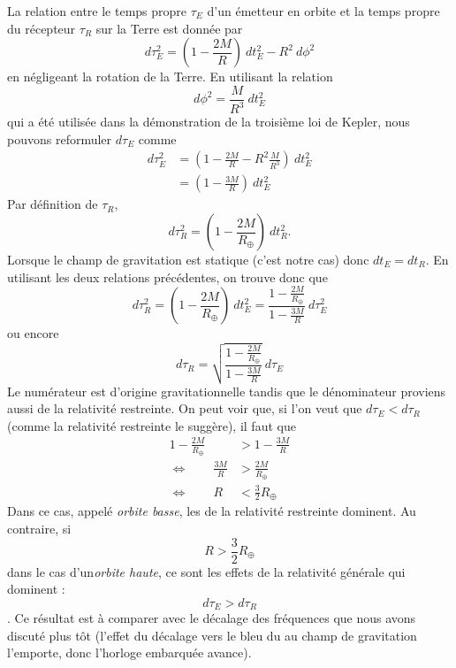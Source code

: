 \documentclass[a4paper,11pt]{report}
\theoremstyle{definition}
\theoremstyle{plain}
\theoremstyle{definition}
\theoremstyle{remark}
\begin{document}
        La relation entre le temps propre $\tau_E$ d'un émetteur en orbite et la temps propre du récepteur $\tau_R$ sur la Terre est donnée par
        \begin{equation}
            d\tau^2_E = \left( 1-\frac{2M}{R} \right)~dt^2_E-R^2~d\phi^2
        \end{equation}
        en négligeant la rotation de la Terre. En utilisant la relation
        \begin{equation}
            d\phi^2 = \frac{M}{R^3}~dt^2_E
        \end{equation}
        qui a été utilisée dans la démonstration de la troisième loi de Kepler, nous pouvons reformuler $d\tau_E$ comme
        \begin{align}
            d\tau^2_E &= \left( 1-\frac{2M}{R}-R^2\frac{M}{R^3} \right)~dt^2_E\\
            &= \left( 1-\frac{3M}{R} \right)~dt^2_E
        \end{align}
        Par définition de $\tau_R$, 
        \begin{equation}
            d\tau^2_R = \left( 1-\frac{2M}{R_\oplus} \right)~dt^2_R.
        \end{equation}
        Lorsque le champ de gravitation est statique (c'est notre cas) donc $dt_E = dt_R$. En utilisant les deux relations précédentes, on trouve donc que
        \begin{equation}
            d\tau^2_R = \left( 1-\frac{2M}{R_\oplus} \right)~dt^2_E = \frac{1-\frac{2M}{R_\oplus}}{1-\frac{3M}{R}}~d\tau^2_E
        \end{equation}
        ou encore
        \begin{equation}
            d\tau_R = \sqrt{\frac{1-\frac{2M}{R_\oplus}}{1-\frac{3M}{R}}}~d\tau_E
        \end{equation}
        Le numérateur est d'origine gravitationnelle tandis que le dénominateur proviens aussi de la relativité restreinte. On peut voir que, si l'on veut que $d\tau_E<d\tau_R$ (comme la relativité restreinte le suggère), il faut que
        \begin{align}
            1-\frac{2M}{R_\oplus} &> 1-\frac{3M}{R} \\
            \Leftrightarrow\qquad \frac{3M}{R} &> \frac{2M}{R_\oplus}\\
            \Leftrightarrow \qquad R &< \frac{3}{2}R_\oplus
        \end{align}
        Dans ce cas, appelé \textit{orbite basse}, les de la relativité restreinte dominent. Au contraire, si
        \begin{equation}
            R > \frac{3}{2}R_\oplus
        \end{equation}
        dans le cas d'un\textit{orbite haute}, ce sont les effets de la relativité générale qui dominent : $$d\tau_E>d\tau_R$$. Ce résultat est à comparer avec le décalage des fréquences que nous avons discuté plus tôt (l'effet du décalage vers le bleu du au champ de gravitation l'emporte, donc l'horloge embarquée avance).\\
        
\end{document}
